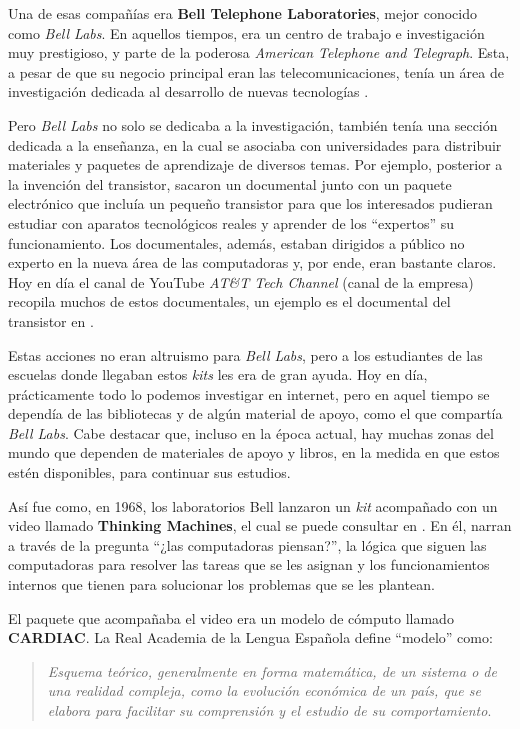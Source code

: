 \documentclass[letterpaper,12pt,oneside]{book}
\begin{document}
        Una de esas compañías era \textbf{Bell Telephone 
		Laboratories}, mejor conocido como \textit{Bell Labs}. En aquellos tiempos, era un centro de trabajo e investigación muy prestigioso, y parte de la
		poderosa \textit{American Telephone and Telegraph}. Esta, a pesar de que su negocio
		principal eran las telecomunicaciones, tenía un área de investigación dedicada al desarrollo de nuevas tecnologías \cite{isaacson_innovators_2014}.
  
        Pero \textit{Bell Labs} no solo se dedicaba a la investigación,
		también tenía una sección dedicada a la enseñanza, en la cual se asociaba con universidades para distribuir materiales y paquetes de aprendizaje de diversos
		temas. Por ejemplo, posterior a la invención del transistor, sacaron un documental junto
		con un paquete electrónico que incluía un pequeño transistor para que los interesados pudieran estudiar con aparatos tecnológicos reales y aprender
		de los ``expertos'' su funcionamiento. Los documentales, además, estaban dirigidos a público no experto en la nueva área de las computadoras y, por ende,
		eran bastante claros. Hoy en día el canal de YouTube \textit{AT\&T Tech Channel} (canal de la empresa) recopila muchos de estos documentales, un ejemplo es el 
		documental del transistor en \cite{att_tech_channel_transistor_2015}.
		
		
		Estas acciones no eran altruismo para \textit{Bell Labs}, pero a los estudiantes de las 
		escuelas donde
		llegaban estos \textit{kits} les era de gran ayuda. Hoy en día, prácticamente todo lo podemos investigar en internet, pero en aquel tiempo se dependía de las
		bibliotecas y de algún material de apoyo, como el que compartía \textit{Bell Labs}. Cabe destacar que, incluso en la época actual, hay muchas zonas del mundo
		que dependen de materiales de apoyo y libros, en la medida en que estos estén disponibles, para continuar sus estudios.
		
		Así fue como, en 1968, los laboratorios Bell lanzaron un \textit{kit} acompañado con un video llamado \textbf{Thinking Machines}, el
		cual se puede consultar en  \cite{att_tech_channel_att_2012}. En él,  narran
		a través de la pregunta ``¿las computadoras piensan?'', la lógica que siguen las computadoras para resolver las tareas que se les asignan y los funcionamientos
		internos que tienen para solucionar los problemas que se les plantean.

        El paquete que acompañaba el video era un modelo de cómputo llamado \textbf{CARDIAC}. La Real Academia de la Lengua Española define  ``modelo'' como:
        \begin{quote}
			\emph{ Esquema teórico, generalmente en forma matemática, de un sistema o de una realidad compleja, como la evolución económica de un país, que se elabora para facilitar su comprensión y el estudio de su comportamiento}.
		\end{quote}
\end{document}
